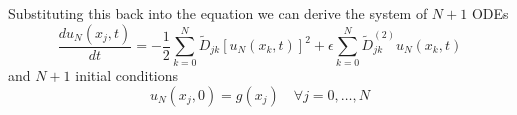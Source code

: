 Substituting this back into the equation we can derive the system of $N+1$ ODEs
\begin{equation}
	\frac{du_N (x_j,t)}{dt} = - \frac{1}{2} \sum_{k=0}^N \tilde{D}_{jk} \left [ u_N (x_k, t)\right]^2 + \epsilon  \sum_{k=0}^N \tilde{D}^{(2)}_{jk} u_N (x_k, t)
	\label{eq:ode_sys}
\end{equation}
and $N+1$ initial conditions
\begin{equation}
	u_N(x_j, 0) = g(x_j) \quad \forall j=0, \dots, N
	\label{eq:init4}
\end{equation}
